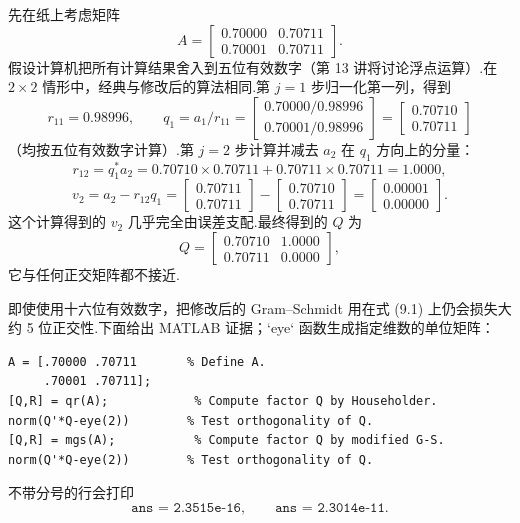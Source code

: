 \documentclass[UTF8,fontset=none,12pt]{ctexart}
\begin{document}
先在纸上考虑矩阵
\begin{equation}
    A=\begin{bmatrix}
        0.70000&0.70711\\
        0.70001&0.70711
    \end{bmatrix}.
    \tag{9.1}
\end{equation}
假设计算机把所有计算结果舍入到五位有效数字（第 13 讲将讨论浮点运算）.在 $2\times2$ 情形中，经典与修改后的算法相同.第 $j=1$ 步归一化第一列，得到
\[
    r_{11}=0.98996,\qquad
    q_1=a_1/r_{11}
    =\begin{bmatrix}0.70000/0.98996\\0.70001/0.98996\end{bmatrix}
    =\begin{bmatrix}0.70710\\0.70711\end{bmatrix}
\]
（均按五位有效数字计算）.第 $j=2$ 步计算并减去 $a_2$ 在 $q_1$ 方向上的分量：
\[
    r_{12}=q_1^*a_2
    =0.70710\times0.70711+0.70711\times0.70711=1.0000,
\]
\[
    v_2=a_2-r_{12}q_1
    =\begin{bmatrix}0.70711\\0.70711\end{bmatrix}
     -\begin{bmatrix}0.70710\\0.70711\end{bmatrix}
    =\begin{bmatrix}0.00001\\0.00000\end{bmatrix}.
\]
这个计算得到的 $v_2$ 几乎完全由误差支配.最终得到的 $Q$ 为
\[
    Q=\begin{bmatrix}0.70710&1.0000\\0.70711&0.0000\end{bmatrix},
\]
它与任何正交矩阵都不接近.

即使使用十六位有效数字，把修改后的 Gram--Schmidt 用在式 (9.1) 上仍会损失大约 5 位正交性.下面给出 MATLAB 证据；`eye` 函数生成指定维数的单位矩阵：

\begin{verbatim}
A = [.70000 .70711       % Define A.
     .70001 .70711];
[Q,R] = qr(A);            % Compute factor Q by Householder.
norm(Q'*Q-eye(2))        % Test orthogonality of Q.
[Q,R] = mgs(A);           % Compute factor Q by modified G-S.
norm(Q'*Q-eye(2))        % Test orthogonality of Q.
\end{verbatim}

不带分号的行会打印
\[
    \texttt{ans = 2.3515e-16},\qquad
    \texttt{ans = 2.3014e-11}.
\]
\end{document}
